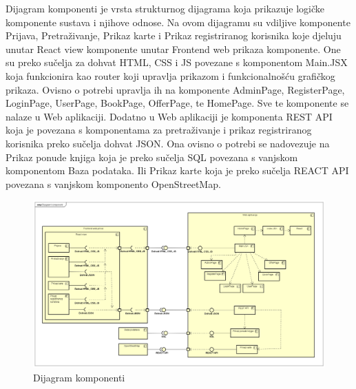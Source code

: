 			Dijagram komponenti je vrsta strukturnog dijagrama koja prikazuje logičke komponente sustava i njihove odnose. Na ovom dijagramu su vdiljive komponente Prijava, Pretraživanje, Prikaz karte i Prikaz registriranog korisnika koje djeluju unutar React view komponente unutar Frontend web prikaza komponente. One su preko sučelja za dohvat HTML, CSS i JS povezane s komponentom Main.JSX koja funkcionira kao router koji upravlja prikazom i funkcionalnošću grafičkog prikaza. Ovisno o potrebi upravlja ih na komponente AdminPage, RegisterPage, LoginPage, UserPage, BookPage, OfferPage, te HomePage. Sve te komponente se nalaze u Web aplikaciji. Dodatno u Web aplikaciji je komponenta REST API koja je povezana s komponentama za pretraživanje i prikaz registriranog korisnika preko sučelja dohvat JSON. Ona ovisno o potrebi se nadovezuje na Prikaz ponude knjiga koja je preko sučelja SQL povezana s vanjskom komponentom Baza podataka. Ili Prikaz karte koja je preko sučelja REACT API povezana s vanjskom komponento OpenStreetMap. 

            \eject
			
			
			\begin{figure}[H]
				\includegraphics[width=\textwidth]{dijagrami/Dijagram komponenti.PNG} %
				\centering
				\caption{Dijagram komponenti }
				\label{fig:dijagramkomponenti1}
			\end{figure}
			
			\eject
